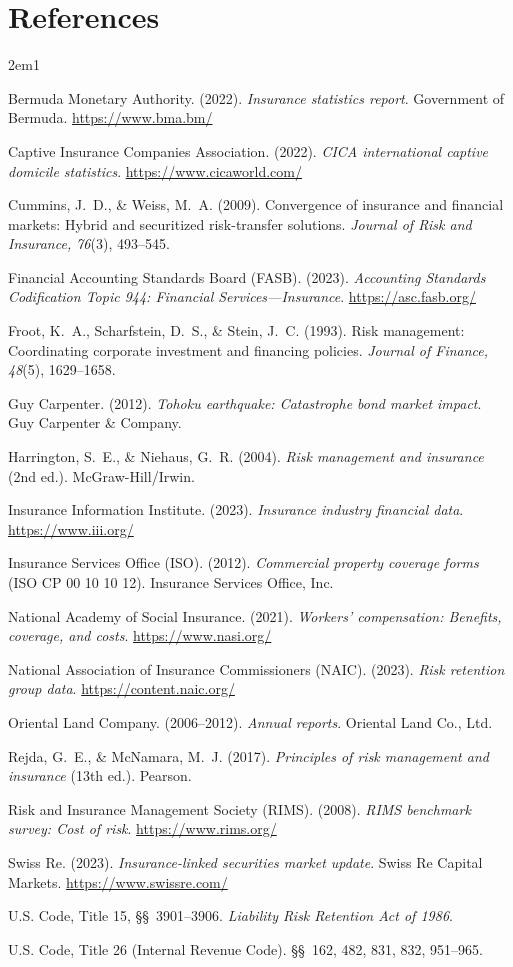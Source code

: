 \documentclass[11pt,openany]{book}
\begin{document}
\section*{References}
\begingroup
\sloppy
\begin{hangparas}{2em}{1}

Bermuda Monetary Authority. (2022). \emph{Insurance statistics report}.
Government of Bermuda. \url{https://www.bma.bm/}

Captive Insurance Companies Association. (2022). \emph{CICA international
captive domicile statistics}. \url{https://www.cicaworld.com/}

Cummins, J.~D., \& Weiss, M.~A. (2009). Convergence of insurance and
financial markets: Hybrid and securitized risk-transfer solutions.
\emph{Journal of Risk and Insurance, 76}(3), 493--545.

Financial Accounting Standards Board (FASB). (2023). \emph{Accounting
Standards Codification Topic 944: Financial Services---Insurance}.
\url{https://asc.fasb.org/}

Froot, K.~A., Scharfstein, D.~S., \& Stein, J.~C. (1993). Risk management:
Coordinating corporate investment and financing policies. \emph{Journal of
Finance, 48}(5), 1629--1658.

Guy Carpenter. (2012). \emph{Tohoku earthquake: Catastrophe bond market
impact}. Guy Carpenter \& Company.

Harrington, S.~E., \& Niehaus, G.~R. (2004). \emph{Risk management and
insurance} (2nd ed.). McGraw-Hill/Irwin.

Insurance Information Institute. (2023). \emph{Insurance industry financial
data}. \url{https://www.iii.org/}

Insurance Services Office (ISO). (2012). \emph{Commercial property coverage
forms} (ISO CP 00 10 10 12). Insurance Services Office, Inc.

National Academy of Social Insurance. (2021). \emph{Workers' compensation:
Benefits, coverage, and costs}. \url{https://www.nasi.org/}

National Association of Insurance Commissioners (NAIC). (2023). \emph{Risk
retention group data}. \url{https://content.naic.org/}

Oriental Land Company. (2006--2012). \emph{Annual reports}. Oriental Land
Co., Ltd.

Rejda, G.~E., \& McNamara, M.~J. (2017). \emph{Principles of risk management
and insurance} (13th ed.). Pearson.

Risk and Insurance Management Society (RIMS). (2008). \emph{RIMS benchmark
survey: Cost of risk}. \url{https://www.rims.org/}

Swiss Re. (2023). \emph{Insurance-linked securities market update}. Swiss Re
Capital Markets. \url{https://www.swissre.com/}

U.S. Code, Title 15, \S\S~3901--3906. \emph{Liability Risk Retention Act of
1986}.

U.S. Code, Title 26 (Internal Revenue Code). \S\S~162, 482, 831, 832,
951--965.

\end{hangparas}
\endgroup
\end{document}
